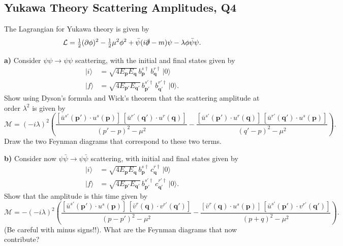 \subsection{Yukawa Theory Scattering Amplitudes, Q4}

The Lagrangian for Yukawa theory is given by
\begin{equation}
    \mathcal{L} = \tfrac{1}{2}(\partial\phi)^2 - \tfrac{1}{2}\mu^2\phi^2 + \bar\psi(i\slashed{\partial}-m)\psi - \lambda\phi\bar\psi\psi.
\end{equation}

\textbf{a)} Consider $\psi\psi\to\psi\psi$ scattering, with the initial and final states given by
\begin{align}
    |i\rangle &= \sqrt{4E_{\mathbf{p}}E_{\mathbf{q}}}\,b^{s\dagger}_{\mathbf{p}}\,b^{r\dagger}_{\mathbf{q}}\,|0\rangle\\
    |f\rangle &= \sqrt{4E_{\mathbf{p}'}E_{\mathbf{q}'}}\,b^{s'\dagger}_{\mathbf{p}'}\,b^{r'\dagger}_{\mathbf{q}'}\,|0\rangle.
\end{align}
Show using Dyson's formula and Wick's theorem that the scattering amplitude at order $\lambda^2$ is given by
\begin{equation}
    \mathcal{M} = (-i\lambda)^2\left(\frac{[\bar{u}^{s'}(\mathbf{p}')\cdot u^s(\mathbf{p})]\,[\bar{u}^{r'}(\mathbf{q}')\cdot u^r(\mathbf{q})]}{(p'-p)^2-\mu^2} - \frac{[\bar{u}^{s'}(\mathbf{p}')\cdot u^r(\mathbf{q})]\,[\bar{u}^{r'}(\mathbf{q}')\cdot u^s(\mathbf{p})]}{(q'-p)^2-\mu^2}\right).
\end{equation}
Draw the two Feynman diagrams that correspond to these two terms.

\textbf{b)} Consider now $\psi\bar\psi\to\psi\bar\psi$ scattering, with initial and final states given by
\begin{align}
    |i\rangle &= \sqrt{4E_{\mathbf{p}}E_{\mathbf{q}}}\,b^{s\dagger}_{\mathbf{p}}\,c^{r\dagger}_{\mathbf{q}}\,|0\rangle\\
    |f\rangle &= \sqrt{4E_{\mathbf{p}'}E_{\mathbf{q}'}}\,b^{s'\dagger}_{\mathbf{p}'}\,c^{r'\dagger}_{\mathbf{q}'}\,|0\rangle.
\end{align}
Show that the amplitude is this time given by
\begin{equation}
    \mathcal{M} = -(-i\lambda)^2\left(\frac{[\bar{u}^{s'}(\mathbf{p}')\cdot u^s(\mathbf{p})]\,[\bar{v}^r(\mathbf{q})\cdot v^{r'}(\mathbf{q}')]}{(p-p')^2-\mu^2} - \frac{[\bar{v}^r(\mathbf{q})\cdot u^s(\mathbf{p})]\,[\bar{u}^{s'}(\mathbf{p}')\cdot v^{r'}(\mathbf{q}')]}{(p+q)^2-\mu^2}\right).
\end{equation}
(Be careful with minus signs!!). What are the Feynman diagrams that now contribute?

